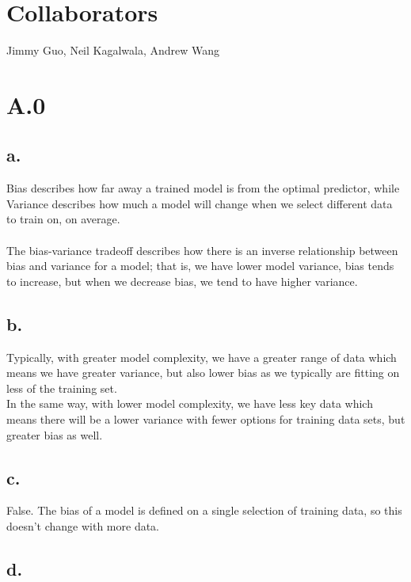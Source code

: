 \documentclass{article}
\date{{}}
\newcommand{\1}{\mathbf{1}}
\begin{document}
\thispagestyle{firstpageheader}

\section*{Collaborators}
{\Large 
Jimmy Guo, Neil Kagalwala, Andrew Wang
}

\section*{A.0}
{\Large 

\subsection*{a.}

Bias describes how far away a trained model is from the optimal predictor, while Variance describes how much a model will change when we select different data to train on, on average. \\ \\
The bias-variance tradeoff describes how there is an inverse relationship between bias and variance for a model; that is, we have lower model variance, bias tends to increase, but when we decrease bias, we tend to have higher variance. 

\subsection*{b.}

Typically, with greater model complexity, we have a greater range of data which means we have greater variance, but also lower bias as we typically are fitting on less of the training set. \\
In the same way, with lower model complexity, we have less key data which means there will be a lower variance with fewer options for training data sets, but greater bias as well.

\subsection*{c.}

False. The bias of a model is defined on a single selection of training data, so this doesn't change with more data.

\subsection*{d.}

}
\end{document}

